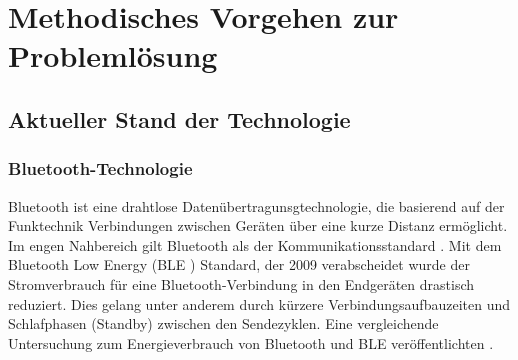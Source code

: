 \section{Methodisches Vorgehen zur Problemlösung}

\subsection{Aktueller Stand der Technologie}

\subsubsection{Bluetooth-Technologie}\label{sssec:BLE}
Bluetooth ist eine drahtlose Datenübertragunsgtechnologie, die basierend auf der Funktechnik Verbindungen zwischen Geräten über eine kurze Distanz ermöglicht. Im engen Nahbereich gilt Bluetooth als der Kommunikationsstandard \citep[Vgl.][S. 133]{mobil-sicher}. Mit dem Bluetooth Low Energy (BLE ) Standard, der 2009 verabscheidet wurde der Stromverbrauch für eine Bluetooth-Verbindung in den Endgeräten drastisch reduziert. Dies gelang unter anderem durch kürzere Verbindungsaufbauzeiten und Schlafphasen (Standby) zwischen den Sendezyklen. Eine vergleichende Untersuchung zum Energieverbrauch von Bluetooth und BLE veröffentlichten \cite{ble-energy}. 


